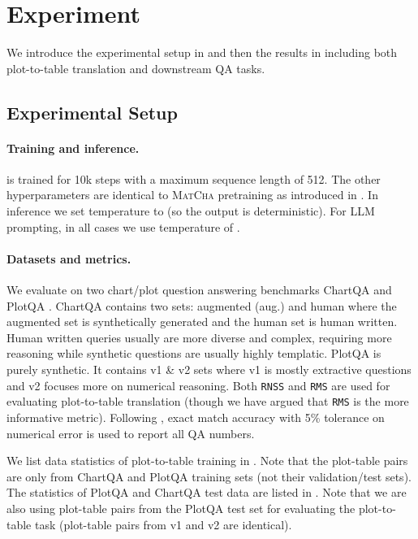\section{Experiment}\label{sec:exp}



We introduce the experimental setup in  and then the results in  including both plot-to-table translation and downstream QA tasks.


\subsection{Experimental Setup}\label{sec:setup}

\paragraph{Training and inference.} \model{} is trained for 10k steps with a maximum sequence length of 512. The other hyperparameters are identical to \textsc{MatCha} pretraining as introduced in \citet{liu2022matcha}. In \model{} inference we set temperature to  (so the output is deterministic). For LLM prompting, in all cases we use temperature of .


\paragraph{Datasets and metrics.} We evaluate on two chart/plot question answering benchmarks ChartQA \citep{masry-etal-2022-chartqa} and PlotQA \citep{methani2020plotqa}. ChartQA contains two sets: augmented (aug.) and human where the augmented set is synthetically generated and the human set is human written. Human written queries usually are more diverse and complex, requiring more reasoning while synthetic questions are usually highly templatic. PlotQA is purely synthetic. It contains v1 \& v2 sets where v1 is mostly extractive questions and v2 focuses more on numerical reasoning.  
Both \texttt{RNSS} and \texttt{RMS} are used for evaluating plot-to-table translation (though we have argued that \texttt{RMS} is the more informative metric). Following \citet{masry-etal-2022-chartqa,methani2020plotqa}, exact match accuracy with 5\% tolerance on numerical error is used to report all QA numbers.


We list data statistics of plot-to-table training in .  Note that the plot-table pairs are only from ChartQA and PlotQA training sets (not their validation/test sets). The statistics of PlotQA and ChartQA test data are listed in . Note that we are also using plot-table pairs from the PlotQA test set for evaluating the plot-to-table task (plot-table pairs from v1 and v2 are identical).

